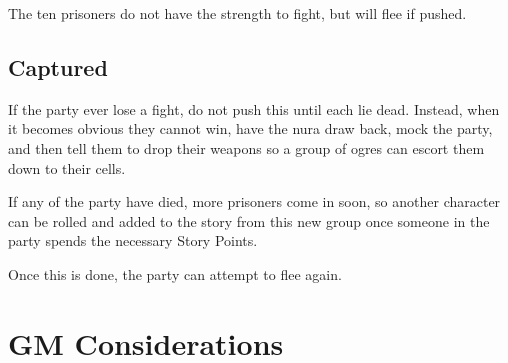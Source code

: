 \begin{multicols}{2}
The ten prisoners do not have the strength to fight, but will flee if pushed.

\subsection{Captured}

If the party ever lose a fight, do not push this until each lie dead.
Instead, when it becomes obvious they cannot win, have the nura draw back, mock the party, and then tell them to drop their weapons so a group of ogres can escort them down to their cells.

If any of the party have died, more prisoners come in soon, so another character can be rolled and added to the story from this new group once someone in the party spends the necessary Story Points.

Once this is done, the party can attempt to flee again.

\end{multicols}

\section{GM Considerations}


